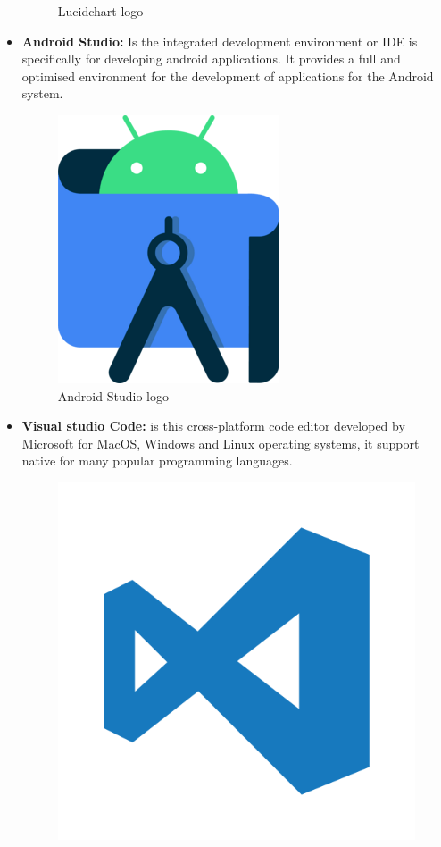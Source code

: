 \begin{itemize}
\begin{figure}[H]
            \caption{Lucidchart logo } 
            \label{fig: Lucidchart logo}
        \end{figure}
    \item \textbf{Android Studio:} Is the integrated development environment or IDE is specifically for developing android applications. It provides a full and optimised environment for the development of applications for the Android system.
            \begin{figure}[H] 
                \centering
                \includegraphics[scale=0.2]{logos/android-studio-logo.png}
                \caption{Android Studio logo } 
                \label{fig: Android Studio logo}
            \end{figure}    
    \item \textbf{Visual studio Code:} is this cross-platform code editor developed by Microsoft for MacOS, Windows and Linux operating systems, 
    it support native for many popular programming languages.
            \begin{figure}[H] 
                \centering
                \includegraphics[scale=0.07]{logos/visual-studio-code-logo.png}

\end{figure}
\end{itemize}
